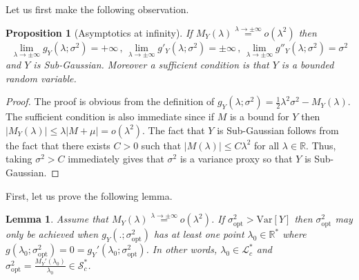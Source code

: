 \documentclass[a4paper, 10pt]{article}
\newcommand{\beq}{\begin{equation}}
\newcommand{\eeq}{\end{equation}}
\newtheorem{proposition}{Proposition}[section]
\newtheorem{lemma}{Lemma}[section]
\theoremstyle{definition}
\begin{document}
Let us first make the following observation.
\begin{proposition}[Asymptotics at infinity]\label{AsymptInf}If $M_Y(\lambda)\overset{\lambda\to\pm \infty}{=}o(\lambda^2)$ then
\beq \lim_{\lambda\to \pm\infty}g_Y(\lambda;\sigma^2)=+\infty\,,\, \lim_{\lambda\to \pm\infty}g'_Y(\lambda;\sigma^2)=\pm\infty\,,\, \lim_{\lambda\to \pm\infty}g''_Y(\lambda;\sigma^2)=\sigma^2\eeq
and $Y$ is Sub-Gaussian. Moreover a sufficient condition is that $Y$ is a bounded random variable.    
\end{proposition}

\begin{proof}The proof is obvious from the definition of $g_Y(\lambda;\sigma^2)=\frac{1}{2}\lambda^2\sigma^2-M_Y(\lambda)$. The sufficient condition is also immediate since if $M$ is a bound for $Y$ then
$|M_Y(\lambda)|\leq \lambda|M+\mu|=o(\lambda^2)$. The fact that $Y$ is Sub-Gaussian follows from the fact that there exists $C>0$ such that $|M(\lambda)|\leq C\lambda^2$ for all $\lambda\in \mathbb{R}$. Thus, taking $\sigma^2>C$ immediately gives that $\sigma^2$ is a variance proxy so that $Y$ is Sub-Gaussian.
\end{proof}

First, let us prove the following lemma.

\begin{lemma}\label{LemmaTechnicalGeneral}Assume that $M_Y(\lambda)\overset{\lambda\to \pm\infty}{=}o(\lambda^2)$. If $\sigma_{\text{opt}}^2>\text{Var}[Y]$ then $\sigma_{\text{opt}}^2$ may only be achieved when $g_Y(.;\sigma_{\text{opt}}^2)$ has at least one point $\lambda_0\in \mathbb{R}^*$ where $g(\lambda_0;\sigma_{\text{opt}}^2)=0=g_Y'(\lambda_0;\sigma_{\text{opt}}^2)$. In other words, $\lambda_0\in \mathcal{L}_c^*$ and $\sigma_{\text{opt}}^2=\frac{M_Y'(\lambda_0)}{\lambda_0}\in \mathcal{S}_c^*$.
\end{lemma}
\end{document}
